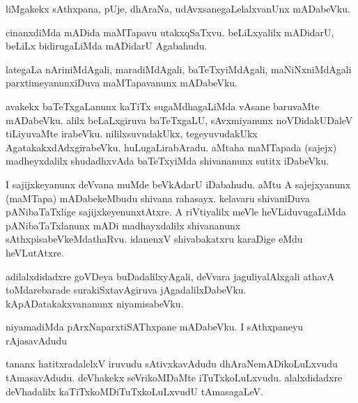 \documentclass{article}
\begin{document}
\begin{mn}
liMgakekx  sAthxpana,  pUje,  dhAraNa,  udAvxsanegaLelalxvanUnx  mADabeVku.
\end{mn}

\begin{mn}
cinanxdiMda mADida  maMTapavu  utakxqSaTxvu.  beLiLxyalilx  mADidarU,  beLiLx bidirugaLiMda  mADidarU  Agabahudu.
\end{mn}

\begin{mn}
lategaLa  nAriniMdAgali,  maradiMdAgali,  baTeTxyiMdAgali,  maNiNxniMdAgali  parxtimeyanunxiDuva  maMTapavanunx  mADabeVku.
\end{mn}

\begin{mn}
avakekx  baTeTxgaLanunx  kaTiTx  sugaMdhagaLiMda  vAsane  baruvaMte  mADabeVku.  alilx  beLaLxgiruva  baTeTxgaLU,  
sAvxmiyanunx  noVDidakUDaleV  tiLiyuvaMte  irabeVku.  nililxsuvudakUkx,  tegeyuvudakUkx  AgatakakxdAdxgirabeVku. 
huLugaLirabAradu.  aMtaha  maMTapada (sajejx) madheyxdalilx  shudadhxvAda  baTeTxyiMda  shivananunx  sutitx  iDabeVku.
\end{mn}

\begin{mn}
I  sajijxkeyanunx  deVvana  muMde  beVkAdarU  iDabahudu.  aMtu  A  sajejxyanunx (maMTapa) mADabekeMbudu  shivana  
rahasayx.  kelavaru  shivaniDuva  pANibaTaTxlige  sajijxkeyenunxtAtxre.  A  riVtiyalilx  meVle  heVLiduvugaLiMda  
pANibaTaTxlanunx  mADi  madhayxdalilx  shivananunx  sAthxpisabeVkeMdathaRvu.  idanenxV  shivabakatxru  karaDige  
eMdu  heVLutAtxre.  
\end{mn}

\begin{mn}
adilalxdidadxre  goVDeya  buDadalilxyAgali,  deVvara  jaguliyalAlxgali  athavA  toMdarebarade  surakiSxtavAgiruva  
jAgadalilxDabeVku.  kApADatakakxvananunx  niyamisabeVku.
\end{mn}

\begin{mn}
niyamadiMda  pArxNaparxtiSAThxpane  mADabeVku.  I  sAthxpaneyu  rAjasavAdudu
\end{mn}

\begin{mn}
tananx  hatitxradalelxV  iruvudu  sAtivxkavAdudu  dhAraNemADikoLuLxvudu  tAmasavAdudu.  deVhakekx  seVrikoMDaMte  
iTuTxkoLuLxvudu.  alalxdidadxre  deVhadalilx  kaTiTxkoMDiTuTxkoLuLxvudU  tAmasagaLeV.
\end{mn}
\end{document}

